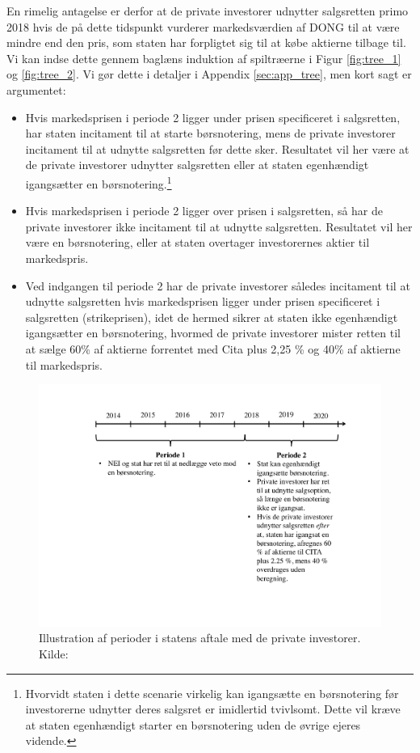 \documentclass{article}
\begin{document}
En rimelig antagelse er derfor at de private investorer udnytter salgsretten primo 2018 hvis de på dette tidspunkt vurderer markedsværdien af DONG til at være mindre end den pris, som staten har forpligtet sig til at købe aktierne tilbage til. Vi kan indse dette gennem baglæns induktion af spiltræerne i Figur \ref{fig:tree_1} og \ref{fig:tree_2}. Vi gør dette i detaljer i Appendix \ref{sec:app_tree}, men kort sagt er argumentet:

\begin{itemize}
	\item Hvis markedsprisen i periode 2 ligger under prisen specificeret i salgsretten, har staten incitament til at starte børsnotering, mens de private investorer incitament til at udnytte salgsretten før dette sker. Resultatet vil her være at de private investorer udnytter salgsretten eller at staten egenhændigt igangsætter en børsnotering.\footnote{Hvorvidt staten i dette scenarie virkelig kan igangsætte en børsnotering før investorerne udnytter deres salgsret er imidlertid tvivlsomt. Dette vil kræve at staten egenhændigt starter en børsnotering uden de øvrige ejeres vidende.}
	\item Hvis markedsprisen i periode 2 ligger over prisen i salgsretten, så har de private investorer ikke incitament til at udnytte salgsretten. Resultatet vil her være en børsnotering, eller at staten overtager investorernes aktier til markedspris.
	\item Ved indgangen til periode 2 har de private investorer således incitament til at udnytte salgsretten hvis markedsprisen ligger under prisen specificeret i salgsretten (strikeprisen), idet de hermed sikrer at staten ikke egenhændigt igangsætter en børsnotering, hvormed de private investorer mister retten til at sælge 60\% af aktierne forrentet med Cita plus 2,25 \% og 40\% af aktierne til markedspris.
\end{itemize} 

\begin{figure}
\includegraphics[scale=0.6]{../figs/perioder}
\caption{Illustration af perioder i statens aftale med de private investorer. Kilde: \citet{FM2013a}}
\label{fig:comp}
\end{figure}
\end{document}
